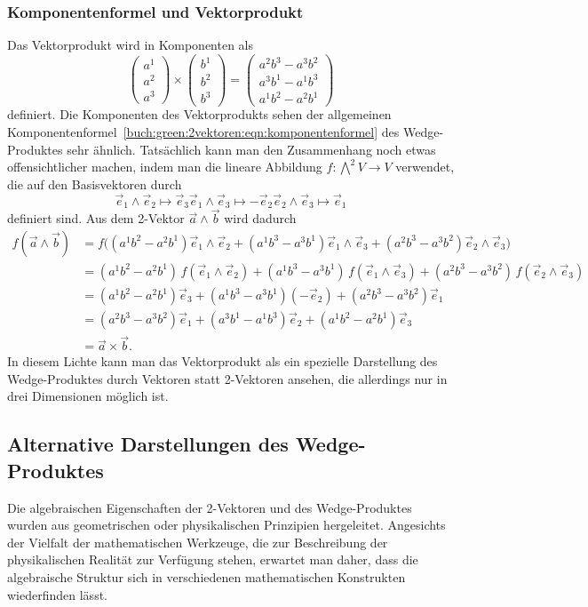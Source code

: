 \subsubsection{Komponentenformel und Vektorprodukt}
Das Vektorprodukt wird in Komponenten als
\[
\begin{pmatrix} a^1 \\ a^2 \\ a^3 \end{pmatrix}
\times
\begin{pmatrix} b^1 \\ b^2 \\ b^3 \end{pmatrix}
=
\begin{pmatrix} a^2b^3-a^3b^2 \\ a^3b^1-a^1b^3 \\ a^1b^2-a^2b^1 \end{pmatrix}
\]
definiert.
Die Komponenten des Vektorprodukts sehen der allgemeinen
Komponentenformel~\eqref{buch:green:2vektoren:eqn:komponentenformel}
des Wedge-Produktes sehr ähnlich.
Tatsächlich kann man den Zusammenhang noch etwas offensichtlicher
machen, indem man die lineare Abbildung $f:\bigwedge^2V\to V$
verwendet, die auf den Basisvektoren durch
\[
\vec{e}_1\wedge\vec{e}_2 \mapsto \vec{e}_3
\vec{e}_1\wedge\vec{e}_3 \mapsto -\vec{e}_2
\vec{e}_2\wedge\vec{e}_3 \mapsto \vec{e}_1
\]
definiert sind.
Aus dem 2-Vektor $\vec{a}\wedge\vec{b}$ wird dadurch
\begin{align*}
f(\vec{a}\wedge\vec{b})
&=
f\bigl((a^1b^2-a^2b^1)\vec{e}_1\wedge\vec{e}_2
      +(a^1b^3-a^3b^1)\vec{e}_1\wedge\vec{e}_3
      +(a^2b^3-a^3b^2)\vec{e}_2\wedge\vec{e}_3\bigr)
\\
&=
(a^1b^2-a^2b^1)\,f(\vec{e}_1\wedge\vec{e}_2)
+(a^1b^3-a^3b^1)\,f(\vec{e}_1\wedge\vec{e}_3)
+(a^2b^3-a^3b^2)\,f(\vec{e}_2\wedge\vec{e}_3)
\\
&=
(a^1b^2-a^2b^1) \vec{e}_3
+(a^1b^3-a^3b^1) (-\vec{e}_2)
+(a^2b^3-a^3b^2) \vec{e}_1
\\
&=
(a^2b^3-a^3b^2) \vec{e}_1
+(a^3b^1-a^1b^3) \vec{e}_2
+(a^1b^2-a^2b^1) \vec{e}_3
\\
&=
\vec{a}\times\vec{b}.
\end{align*}
In diesem Lichte kann man das Vektorprodukt als ein spezielle Darstellung
des Wedge-Produktes durch Vektoren statt 2-Vektoren ansehen, die allerdings
nur in drei Dimensionen möglich ist.

%
%
\subsection{Alternative Darstellungen des Wedge-Produktes}
Die algebraischen Eigenschaften der 2-Vektoren und des Wedge-Produktes
wurden aus geometrischen oder physikalischen Prinzipien hergeleitet.
Angesichts der Vielfalt der mathematischen Werkzeuge, die zur Beschreibung
der physikalischen Realität zur Verfügung stehen, erwartet man daher,
dass die algebraische Struktur sich in verschiedenen mathematischen
Konstrukten wiederfinden lässt.

